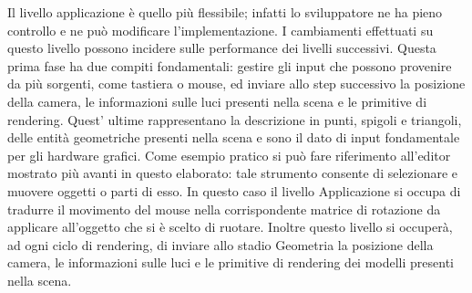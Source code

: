 Il livello applicazione è quello più flessibile; infatti lo sviluppatore ne ha pieno controllo e ne può modificare l’implementazione. I cambiamenti effettuati su questo livello possono incidere sulle performance dei livelli successivi. 
Questa prima fase ha due compiti fondamentali: gestire gli input che possono provenire da più sorgenti, come tastiera o mouse, ed inviare allo step successivo la posizione della camera, le informazioni sulle luci presenti nella scena e le primitive di rendering.
Quest’ ultime rappresentano la descrizione in punti, spigoli e triangoli, delle entità geometriche presenti nella scena e sono il dato di input fondamentale per gli hardware grafici. 
Come esempio pratico si può fare riferimento all’editor mostrato più avanti in questo elaborato: tale strumento consente di selezionare e muovere oggetti o parti di esso. 
In questo caso il livello Applicazione si occupa di tradurre il movimento del mouse nella corrispondente matrice di rotazione da applicare all’oggetto che si è scelto di ruotare. 
Inoltre questo livello si occuperà, ad ogni ciclo di rendering, di inviare allo stadio Geometria la posizione della camera, le informazioni sulle luci e le primitive di rendering dei modelli presenti nella scena.

